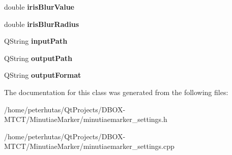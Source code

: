 \begin{DoxyCompactItemize}
\mbox{\label{class_minutiae_marker_settings_ad5a13e621dca663a115041b7d3658e35}} 
double {\bfseries iris\+Blur\+Value}
\item 
\mbox{\label{class_minutiae_marker_settings_a5951e765774e2d2d32f28d5684f31f2c}} 
double {\bfseries iris\+Blur\+Radius}
\item 
\mbox{\label{class_minutiae_marker_settings_a29727848d836b74c0775a46971a5640c}} 
Q\+String {\bfseries input\+Path}
\item 
\mbox{\label{class_minutiae_marker_settings_a0caefff631a181ba8fe7a110e3d7027e}} 
Q\+String {\bfseries output\+Path}
\item 
\mbox{\label{class_minutiae_marker_settings_a461fbeb5b69a85960e67e1a63b91a5cf}} 
Q\+String {\bfseries output\+Format}
\end{DoxyCompactItemize}


The documentation for this class was generated from the following files\+:\begin{DoxyCompactItemize}
\item 
/home/peterhutas/\+Qt\+Projects/\+D\+B\+O\+X-\/\+M\+T\+C\+T/\+Minutiae\+Marker/minutiaemarker\+\_\+settings.\+h\item 
/home/peterhutas/\+Qt\+Projects/\+D\+B\+O\+X-\/\+M\+T\+C\+T/\+Minutiae\+Marker/minutiaemarker\+\_\+settings.\+cpp\end{DoxyCompactItemize}

